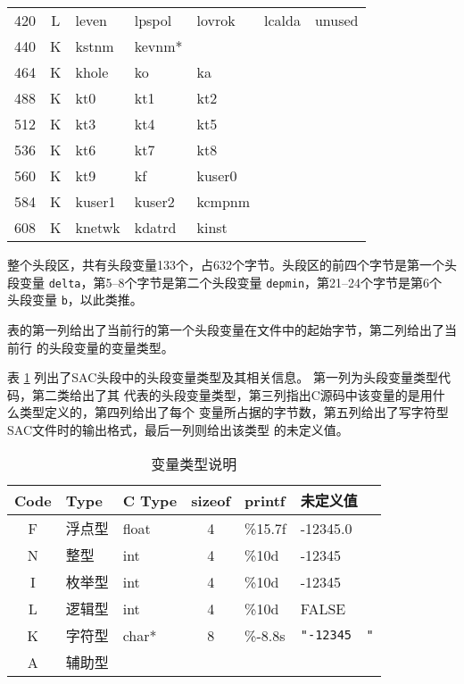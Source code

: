\begin{table}[H]
\begin{tabular}{c|c|lllll}
	420		&	L	&	leven	&	lpspol	&	lovrok	&	lcalda	&	unused	\\
	440		&	K	&	kstnm	&	kevnm*	&			&			&			\\
	464		&	K	&	khole	&	ko		&	ka		&			&			\\
	488		&	K	&	kt0		&	kt1		&	kt2		&			&			\\
	512		&	K	&	kt3		&	kt4		&	kt5		&			&			\\
	536		&	K	&	kt6		&	kt7		&	kt8		&			&			\\
	560		&	K	&	kt9		&	kf		&	kuser0	&			&			\\
	584		&	K	&	kuser1	&	kuser2	&	kcmpnm	&			&			\\
	608		&	K	&	knetwk	&	kdatrd	&	kinst	&			&			\\
    \bottomrule
\end{tabular}
\end{table}

整个头段区，共有头段变量133个，占632个字节。头段区的前四个字节是第一个头段变量
\texttt{delta}，第5--8个字节是第二个头段变量 \texttt{depmin}，第21--24个字节是第6个
头段变量 \texttt{b}，以此类推。

表的第一列给出了当前行的第一个头段变量在文件中的起始字节，第二列给出了当前行
的头段变量的变量类型。

表 \ref{table:header-variables-type} 列出了SAC头段中的头段变量类型及其相关信息。
第一列为头段变量类型代码，第二类给出了其
代表的头段变量类型，第三列指出C源码中该变量的是用什么类型定义的，第四列给出了每个
变量所占据的字节数，第五列给出了写字符型SAC文件时的输出格式，最后一列则给出该类型
的未定义值。

\begin{table}[H]
\caption{变量类型说明}
\label{table:header-variables-type}
\centering
\ttfamily
\small
\begin{tabular}{cllcll}
	\toprule
    Code    &	Type        &   C Type & sizeof &   printf	&   未定义值        \\
	\midrule
    F		&	浮点型		&   float  &  4     &	\%15.7f &   -12345.0        \\
    N		&	整型		&   int    &  4     &	\%10d   &   -12345        \\
    I		&	枚举型		&   int    &  4     &	\%10d   &   -12345	        \\
    L		&	逻辑型		&   int    &  4     &	\%10d   &   FALSE        \\
    K		&	字符型		&   char*  &  8     &	\%-8.8s & \lstinline[showspaces=true]!"-12345  "!     \\
    A		&	辅助型		&          &        &			& 	    \\
	\bottomrule
\end{tabular}
\end{table}

